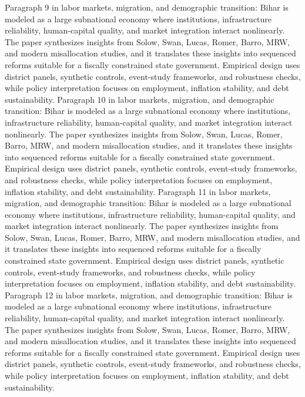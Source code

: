 \documentclass[preprint,12pt]{elsarticle}
\begin{document}
Paragraph 9 in labor markets, migration, and demographic transition: Bihar is modeled as a large subnational economy where institutions, infrastructure reliability, human-capital quality, and market integration interact nonlinearly. The paper synthesizes insights from Solow, Swan, Lucas, Romer, Barro, MRW, and modern misallocation studies, and it translates these insights into sequenced reforms suitable for a fiscally constrained state government. Empirical design uses district panels, synthetic controls, event-study frameworks, and robustness checks, while policy interpretation focuses on employment, inflation stability, and debt sustainability.
Paragraph 10 in labor markets, migration, and demographic transition: Bihar is modeled as a large subnational economy where institutions, infrastructure reliability, human-capital quality, and market integration interact nonlinearly. The paper synthesizes insights from Solow, Swan, Lucas, Romer, Barro, MRW, and modern misallocation studies, and it translates these insights into sequenced reforms suitable for a fiscally constrained state government. Empirical design uses district panels, synthetic controls, event-study frameworks, and robustness checks, while policy interpretation focuses on employment, inflation stability, and debt sustainability.
Paragraph 11 in labor markets, migration, and demographic transition: Bihar is modeled as a large subnational economy where institutions, infrastructure reliability, human-capital quality, and market integration interact nonlinearly. The paper synthesizes insights from Solow, Swan, Lucas, Romer, Barro, MRW, and modern misallocation studies, and it translates these insights into sequenced reforms suitable for a fiscally constrained state government. Empirical design uses district panels, synthetic controls, event-study frameworks, and robustness checks, while policy interpretation focuses on employment, inflation stability, and debt sustainability.
Paragraph 12 in labor markets, migration, and demographic transition: Bihar is modeled as a large subnational economy where institutions, infrastructure reliability, human-capital quality, and market integration interact nonlinearly. The paper synthesizes insights from Solow, Swan, Lucas, Romer, Barro, MRW, and modern misallocation studies, and it translates these insights into sequenced reforms suitable for a fiscally constrained state government. Empirical design uses district panels, synthetic controls, event-study frameworks, and robustness checks, while policy interpretation focuses on employment, inflation stability, and debt sustainability.
\end{document}

